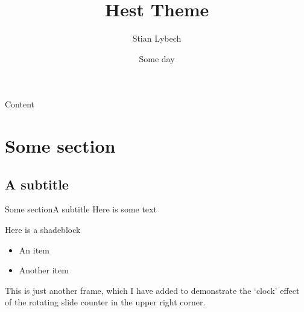 \documentclass[10pt,xcolor={dvipsnames}]{beamer}
\title[Hest Beamer Theme]{Hest Theme}
\subtitle[]{}
\author[Stian Lybech]{Stian Lybech}
\institute[]{Somewhere}
\date{Some day}
\begin{document}
\begin{frame} 
  \titlepage
\end{frame}

\begin{frame}{Content}{}
  \tableofcontents
\end{frame}

\section{Some section}
\subsection{A subtitle}
\begin{frame}{Some section}{A subtitle}
Here is some text
  \begin{shadeblock}{Here is a shadeblock}
    \begin{itemize}
      \item An item
      \item Another item
    \end{itemize}
  \end{shadeblock}
\end{frame}

\begin{frame}
This is just another frame, which I have added to demonstrate the `clock' effect of the rotating slide counter in the upper right corner.
\end{frame}

\begin{frame}
\end{frame}
\end{document}
